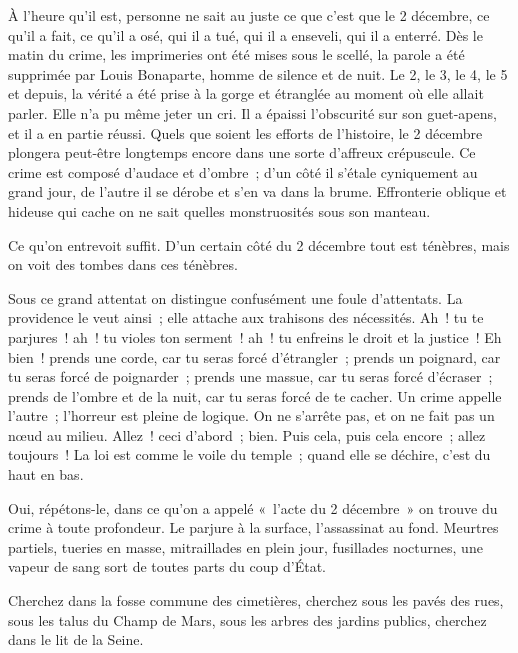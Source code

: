 \documentclass[french,twoside]{book} %
\begin{document}
À l’heure qu’il est, personne ne sait au juste ce que c’est que le 2 décembre, ce qu’il a fait, ce qu’il a osé, qui il a tué, qui il a enseveli, qui il a enterré. Dès le matin du crime, les imprimeries ont été mises sous le scellé, la parole a été supprimée par Louis Bonaparte, homme de silence et de nuit. Le 2, le 3, le 4, le 5 et depuis, la vérité a été prise à la gorge et étranglée au moment où elle allait parler. Elle n’a pu même jeter un cri. Il a épaissi l’obscurité sur son guet-apens, et il a en partie réussi. Quels que soient les efforts de l’histoire, le 2 décembre plongera peut-être longtemps encore dans une sorte d’affreux crépuscule. Ce crime est composé d’audace et d’ombre ; d’un côté il s’étale cyniquement au grand jour, de l’autre il se dérobe et s’en va dans la brume. Effronterie oblique et hideuse qui cache on ne sait quelles monstruosités sous son manteau.\par
Ce qu’on entrevoit suffit. D’un certain côté du 2 décembre tout est ténèbres, mais on voit des tombes dans ces ténèbres.\par
Sous ce grand attentat on distingue confusément une foule d’attentats. La providence le veut ainsi ; elle attache aux trahisons des nécessités. Ah ! tu te parjures ! ah ! tu violes ton serment ! ah ! tu enfreins le droit et la justice ! Eh bien ! prends une corde, car tu seras forcé d’étrangler ; prends un poignard, car tu seras forcé de poignarder ; prends une massue, car tu seras forcé d’écraser ; prends de l’ombre et de la nuit, car tu seras forcé de te cacher. Un crime appelle l’autre ; l’horreur est pleine de logique. On ne s’arrête pas, et on ne fait pas un nœud au milieu. Allez ! ceci d’abord ; bien. Puis cela, puis cela encore ; allez toujours ! La loi est comme le voile du temple ; quand elle se déchire, c’est du haut en bas.\par
Oui, répétons-le, dans ce qu’on a appelé « l’acte du 2 décembre » on trouve du crime à toute profondeur. Le parjure à la surface, l’assassinat au fond. Meurtres partiels, tueries en masse, mitraillades en plein jour, fusillades nocturnes, une vapeur de sang sort de toutes parts du coup d’État.\par
Cherchez dans la fosse commune des cimetières, cherchez sous les pavés des rues, sous les talus du Champ de Mars, sous les arbres des jardins publics, cherchez dans le lit de la Seine.\par
\end{document}
